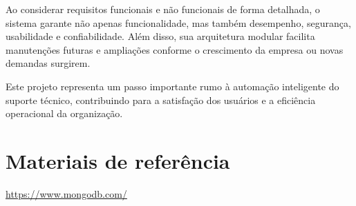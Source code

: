 \documentclass[a4paper,12pt]{article}
\begin{document}
Ao considerar requisitos funcionais e não funcionais de forma detalhada, o sistema garante não apenas funcionalidade, mas também desempenho, segurança, usabilidade e confiabilidade. Além disso, sua arquitetura modular facilita manutenções futuras e ampliações conforme o crescimento da empresa ou novas demandas surgirem.

Este projeto representa um passo importante rumo à automação inteligente do suporte técnico, contribuindo para a satisfação dos usuários e a eficiência operacional da organização.

\section{Materiais de referência}
\sloppy %
\begin{samepage}
\noindent
\url{https://www.mongodb.com/}
\end{samepage}
\end{document}

